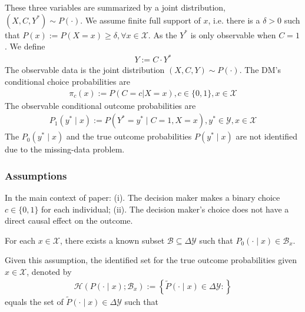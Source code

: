 \documentclass[11pt]{elegantbook}
\begin{document}
These three variables are summarized by a joint distribution, $(X,C,Y^*)\sim P(\cdot)$. We assume finite full support of $x$, i.e. there is a $\delta>0$ such that $P(x):=P(X=x)\geq \delta,\forall x\in \mathcal{X}$. As the $Y^*$ is only observable when $C=1$. We define
\begin{equation}
    \begin{aligned}
        Y:=C\cdot Y^*
    \end{aligned}
    \nonumber
\end{equation}
The observable data is the joint distribution $(X,C,Y)\sim P(\cdot)$. The DM's conditional choice probabilities are
\begin{equation}
    \begin{aligned}
        \pi_c(x):=P(C=c|X=x),c\in\{0,1\},x\in \mathcal{X}
    \end{aligned}
    \nonumber
\end{equation}
The observable conditional outcome probabilities are
\begin{equation}
    \begin{aligned}
        P_1(y^*\mid x):=P(Y^*=y^*\mid C=1, X=x),y^*\in \mathcal{Y},x\in \mathcal{X}
    \end{aligned}
    \nonumber
\end{equation}
The $P_0(y^*\mid x)$ and the true outcome probabilities $P(y^*\mid x)$ are not identified due to the missing-data problem.

\subsubsection*{Assumptions}
\begin{note}
    In the main context of paper: (i). The decision maker makes a binary choice $c\in\{0,1\}$ for each individual; (ii). The decision maker's choice does not have a direct causal effect on the outcome.
\end{note}

\begin{assumption}
    For each $x\in \mathcal{X}$, there exists a known subset $\mathcal{B}\subseteq \Delta \mathcal{Y}$ such that $P_0(\cdot\mid x)\in \mathcal{B}_x$.
\end{assumption}
Given this assumption, the identified set for the true outcome probabilities given $x\in \mathcal{X}$, denoted by
\begin{equation}
    \begin{aligned}
        \mathcal{H}(P(\cdot\mid x);\mathcal{B}_x):=\left\{\tilde{P}(\cdot\mid x)\in\Delta \mathcal{Y}:\right\}
    \end{aligned}
    \nonumber
\end{equation}
equals the set of $\tilde{P}(\cdot\mid x)\in\Delta \mathcal{Y}$ such that 





\appendix











\end{document}
